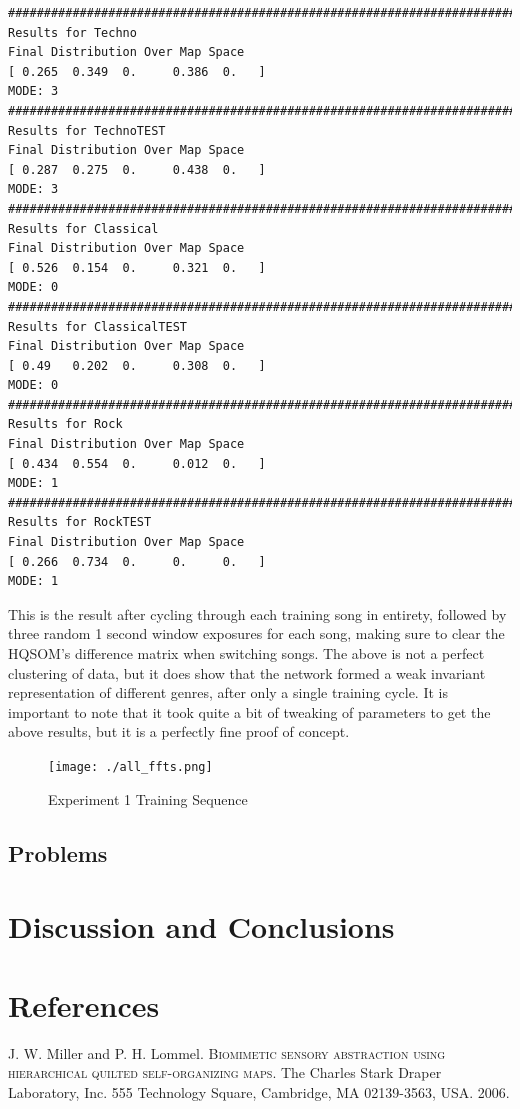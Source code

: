 \documentclass[a4paper,10pt]{article}
\begin{document}
\begin{center}
\begin{verbatim}
################################################################################
Results for Techno
Final Distribution Over Map Space
[ 0.265  0.349  0.     0.386  0.   ]
MODE: 3
################################################################################
Results for TechnoTEST
Final Distribution Over Map Space
[ 0.287  0.275  0.     0.438  0.   ]
MODE: 3
################################################################################
Results for Classical
Final Distribution Over Map Space
[ 0.526  0.154  0.     0.321  0.   ]
MODE: 0
################################################################################
Results for ClassicalTEST
Final Distribution Over Map Space
[ 0.49   0.202  0.     0.308  0.   ]
MODE: 0
################################################################################
Results for Rock
Final Distribution Over Map Space
[ 0.434  0.554  0.     0.012  0.   ]
MODE: 1
################################################################################
Results for RockTEST
Final Distribution Over Map Space
[ 0.266  0.734  0.     0.     0.   ]
MODE: 1
\end{verbatim}
\end{center}

This is the result after cycling through each training song in entirety, followed by three random 1
second window exposures for each song, making sure to clear the HQSOM's difference matrix when
switching songs.  The above is not a perfect clustering of data, but it does show that the network
formed a weak invariant representation of different genres, after only a single training cycle.  It
is important to note that it took quite a bit of tweaking of parameters to get the above results,
but it is a perfectly fine proof of concept.

\begin{figure}
\begin{center}
  \texttt{[image: ./all\_ffts.png]}
\end{center}
\caption{Experiment 1 Training Sequence}
\label{fig:FFTS}
\end{figure} 




\subsection{Problems}
\section{Discussion and Conclusions}
\section{References}

\begin{thebibliography}{}
 J. W. Miller and P. H. Lommel. \textsc{Biomimetic sensory abstraction using
hierarchical quilted self-organizing maps}. The Charles Stark Draper Laboratory, Inc.
555 Technology Square, Cambridge, MA 02139-3563, USA. 2006.
\end{thebibliography}
\end{document}

